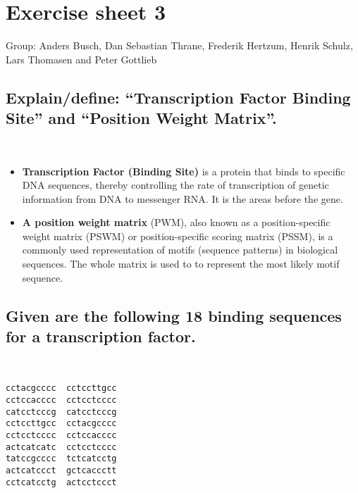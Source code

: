 \documentclass[a4paper,10pt,titlepage]{article}
\begin{document}
\section*{Exercise sheet 3}

Group: Anders Busch, Dan Sebastian Thrane, Frederik Hertzum, Henrik Schulz, Lars Thomasen and Peter Gottlieb

\subsection*{Explain/define: “Transcription Factor Binding Site” and “Position Weight Matrix”.}\\

\begin{itemize}
\item
\textbf{Transcription Factor (Binding Site)} is a protein that binds to specific DNA sequences, thereby controlling the rate of transcription of genetic information from DNA to messenger RNA. It is the areas before the gene.
\item
\textbf{A position weight matrix} (PWM), also known as a position-specific weight matrix (PSWM) or position-specific scoring matrix (PSSM), is a commonly used representation of motifs (sequence patterns) in biological sequences. The whole matrix is used to to represent the most likely motif sequence.
\end{itemize}

\subsection*{Given are the following 18 binding sequences for a transcription
factor.}\\

\begin{verbatim}
cctacgcccc	cctccttgcc
cctccacccc	cctcctcccc
catcctcccg	catcctcccg
cctccttgcc	cctacgcccc
cctcctcccc	cctccacccc
actcatcatc	cctcctcccc
tatccgcccc	tctcatcctg
actcatccct	gctcaccctt
cctcatcctg	actcctccct
\end{verbatim}
\end{document}
